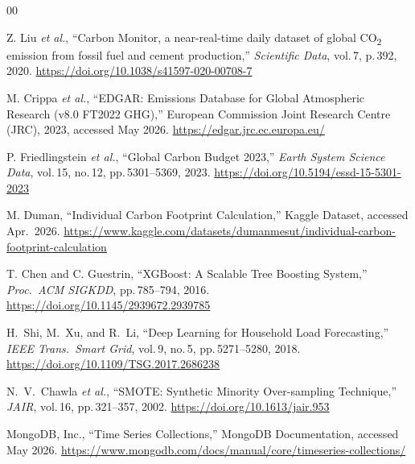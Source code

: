 \documentclass[conference]{IEEEtran}
\begin{document}
\begin{thebibliography}{00}

Z. Liu \textit{et al.}, ``Carbon Monitor, a near-real-time daily dataset of
global CO\textsubscript{2} emission from fossil fuel and cement production,''
\textit{Scientific Data}, vol.\,7, p.\,392, 2020.
\url{https://doi.org/10.1038/s41597-020-00708-7}

M. Crippa \textit{et al.}, ``EDGAR: Emissions Database for Global Atmospheric
Research (v8.0 FT2022 GHG),'' European Commission Joint Research Centre (JRC), 2023, accessed May 2026.
\url{https://edgar.jrc.ec.europa.eu/}

P. Friedlingstein \textit{et al.}, ``Global Carbon Budget 2023,'' \textit{Earth System Science Data}, vol.\,15, no.\,12, pp.\,5301--5369, 2023.
\url{https://doi.org/10.5194/essd-15-5301-2023}

M. Duman, ``Individual Carbon Footprint Calculation,'' Kaggle Dataset,
accessed Apr.\ 2026.
\url{https://www.kaggle.com/datasets/dumanmesut/individual-carbon-footprint-calculation}

T. Chen and C. Guestrin, ``XGBoost: A Scalable Tree Boosting System,''
\textit{Proc.\ ACM SIGKDD}, pp.\,785--794, 2016.
\url{https://doi.org/10.1145/2939672.2939785}

H.\ Shi, M.\ Xu, and R.\ Li, ``Deep Learning for Household Load Forecasting,''
\textit{IEEE Trans.\ Smart Grid}, vol.\,9, no.\,5, pp.\,5271--5280, 2018.
\url{https://doi.org/10.1109/TSG.2017.2686238}

N.\ V.\ Chawla \textit{et al.}, ``SMOTE: Synthetic Minority Over-sampling
Technique,'' \textit{JAIR}, vol.\,16, pp.\,321--357, 2002.
\url{https://doi.org/10.1613/jair.953}

MongoDB, Inc., ``Time Series Collections,'' MongoDB Documentation, accessed
May 2026. \url{https://www.mongodb.com/docs/manual/core/timeseries-collections/}

\end{thebibliography}
\end{document}
